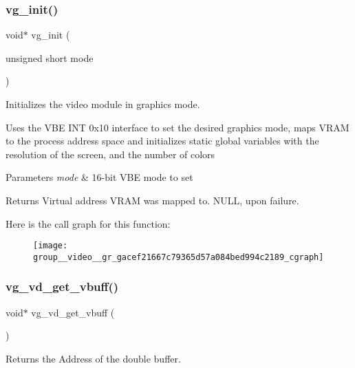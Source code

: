 \subsubsection{\texorpdfstring{vg\+\_\+init()}{vg\_init()}}
{\footnotesize\ttfamily void$\ast$ vg\+\_\+init (\begin{DoxyParamCaption}\item[{unsigned short}]{mode }\end{DoxyParamCaption})}



Initializes the video module in graphics mode. 

Uses the V\+BE I\+NT 0x10 interface to set the desired graphics mode, maps V\+R\+AM to the process\textquotesingle{} address space and initializes static global variables with the resolution of the screen, and the number of colors


\begin{DoxyParams}{Parameters}
{\em mode} & 16-\/bit V\+BE mode to set \\
\hline
\end{DoxyParams}
\begin{DoxyReturn}{Returns}
Virtual address V\+R\+AM was mapped to. N\+U\+LL, upon failure. 
\end{DoxyReturn}
Here is the call graph for this function\+:
\nopagebreak
\begin{figure}[H]
\begin{center}
\leavevmode
\texttt{[image: group\_\_video\_\_gr\_gacef21667c79365d57a084bed994c2189\_cgraph]}
\end{center}
\end{figure}
\hypertarget{group__video__gr_ga3a176fda764c03218b5c20797f8b255e}{}\label{group__video__gr_ga3a176fda764c03218b5c20797f8b255e} 
\subsubsection{\texorpdfstring{vg\+\_\+vd\+\_\+get\+\_\+vbuff()}{vg\_vd\_get\_vbuff()}}
{\footnotesize\ttfamily void$\ast$ vg\+\_\+vd\+\_\+get\+\_\+vbuff (\begin{DoxyParamCaption}{ }\end{DoxyParamCaption})}



Returns the Address of the double buffer. 

